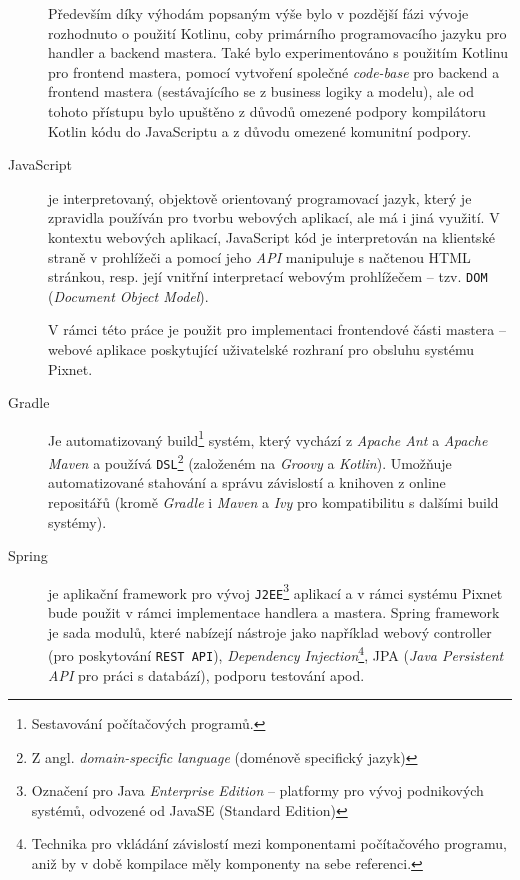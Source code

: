 \begin{description}
    Především díky výhodám popsaným výše bylo v pozdější fázi vývoje rozhodnuto o použití Kotlinu, coby primárního programovacího jazyku pro handler a backend mastera. Také bylo experimentováno s použitím Kotlinu pro frontend mastera, pomocí vytvoření společné \textit{code-base} pro backend a frontend mastera (sestávajícího se z business logiky a modelu), ale od tohoto přístupu bylo upuštěno z důvodů omezené podpory kompilátoru Kotlin kódu do JavaScriptu a z důvodu omezené komunitní podpory.
    
    \item[JavaScript] je interpretovaný, objektově orientovaný programovací jazyk, který je zpravidla používán pro tvorbu webových aplikací, ale má i jiná využití. V kontextu webových aplikací, JavaScript kód je interpretován na klientské straně v prohlížeči a pomocí jeho \textit{API} manipuluje s načtenou HTML stránkou, resp. její vnitřní interpretací webovým prohlížečem -- tzv. \texttt{DOM} (\textit{Document Object Model}).
    
    V rámci této práce je použit pro implementaci frontendové části mastera -- webové aplikace poskytující uživatelské rozhraní pro obsluhu systému Pixnet.
     
    \item[Gradle] Je automatizovaný build\footnote{Sestavování počítačových programů.} systém, který vychází z \textit{Apache Ant} a \textit{Apache Maven} a používá \texttt{DSL}\footnote{Z angl. \textit{domain-specific language} (doménově specifický jazyk)} (založeném na \textit{Groovy} a \textit{Kotlin}). Umožňuje automatizované stahování a správu závislostí a knihoven z online repositářů (kromě \textit{Gradle} i \textit{Maven} a \textit{Ivy} pro kompatibilitu s dalšími build systémy).
    
    \item[Spring]\label{chap:arch:technologie:spring} je aplikační framework pro vývoj \texttt{J2EE}\footnote{Označení pro Java \textit{Enterprise Edition} -- platformy pro vývoj podnikových systémů, odvozené od JavaSE (Standard Edition)} aplikací a v rámci systému Pixnet bude použit v rámci implementace handlera a mastera. Spring framework je sada modulů, které nabízejí nástroje jako například webový controller (pro poskytování \texttt{REST API}), \textit{Dependency Injection}\footnote{Technika pro vkládání závislostí mezi komponentami počítačového programu, aniž by v době kompilace měly komponenty na sebe referenci.}, JPA (\textit{Java Persistent API} pro práci s databází), podporu testování apod.


\end{description}

